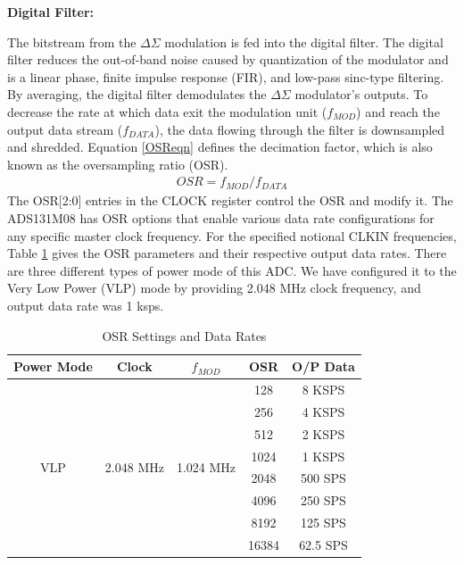 \vspace{1\baselineskip}\par 
\textbf{Digital Filter:}  \par
The bitstream from the $\Delta\Sigma$ modulation is fed into the digital filter. The digital filter reduces the out-of-band noise caused by quantization of the modulator and is a linear phase, finite impulse response (FIR), and low-pass sinc-type filtering. By averaging, the digital filter demodulates the $\Delta\Sigma$ modulator's outputs. To decrease the rate at which data exit the modulation unit ($f_{MOD}$) and reach the output data stream ($f_{DATA}$), the data flowing through the filter is downsampled and shredded. Equation \ref{OSReqn} defines the decimation factor, which is also known as the oversampling ratio (OSR).
\begin{align} \label{OSReqn}
    OSR = f_{MOD}/f_{DATA}
\end{align}
The OSR[2:0] entries in the CLOCK register control the OSR and modify it. The ADS131M08 has OSR options that enable various data rate configurations for any specific master clock frequency. For the specified notional CLKIN frequencies, Table \ref{tab:OSR} gives the OSR parameters and their respective output data rates. There are three different types of power mode of this ADC. We have configured it to the Very Low Power (VLP) mode by providing 2.048 MHz clock frequency, and output data rate was 1 ksps.
\begin{table}[htbp]
  \centering
     \caption{OSR Settings and Data Rates}
    \label{tab:OSR}
  \begin{tabular}{|c|c|c|c|c|}
    \hline
    \multicolumn{1}{|c|}{\textbf{Power Mode}} & \multicolumn{1}{|c|}{\textbf{Clock}} & \multicolumn{1}{|c|}{\textbf{$f_{MOD}$}} & \multicolumn{1}{c|}{\textbf{OSR}} & \multicolumn{1}{c|}{\textbf{O/P Data}} \\
    \hline
    \multirow{8}{*}{VLP} & \multirow{8}{*}{2.048 MHz} & \multirow{8}{*}{1.024 MHz} & 128 & 8 KSPS \\
    & & & 256 & 4 KSPS \\
    & & & 512 & 2 KSPS \\
    & & & 1024 & 1 KSPS \\
    & & & 2048  & 500 SPS \\
    & & & 4096 & 250 SPS \\
    & & & 8192 & 125 SPS \\
    & & & 16384 & 62.5 SPS \\
    \hline
  \end{tabular}

\end{table}

